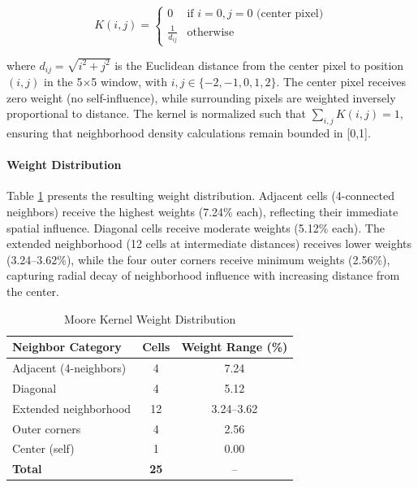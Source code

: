 \documentclass[conference]{IEEEtran}
\begin{document}
\begin{equation}
K(i,j) = \begin{cases}
0 & \text{if } i=0, j=0 \text{ (center pixel)} \\
\frac{1}{d_{ij}} & \text{otherwise}
\end{cases}
\label{eq:moore_kernel}
\end{equation}

where $d_{ij} = \sqrt{i^2 + j^2}$ is the Euclidean distance from the center pixel to position $(i,j)$ in the 5$\times$5 window, with $i,j \in \{-2,-1,0,1,2\}$. The center pixel receives zero weight (no self-influence), while surrounding pixels are weighted inversely proportional to distance. The kernel is normalized such that $\sum_{i,j} K(i,j) = 1$, ensuring that neighborhood density calculations remain bounded in [0,1].

\paragraph{Weight Distribution}
Table \ref{tab:moore_weights} presents the resulting weight distribution. Adjacent cells (4-connected neighbors) receive the highest weights (7.24\% each), reflecting their immediate spatial influence. Diagonal cells receive moderate weights (5.12\% each). The extended neighborhood (12 cells at intermediate distances) receives lower weights (3.24--3.62\%), while the four outer corners receive minimum weights (2.56\%), capturing radial decay of neighborhood influence with increasing distance from the center.

\begin{table}[!t]
\caption{Moore Kernel Weight Distribution}
\label{tab:moore_weights}
\centering
\small
\renewcommand{\arraystretch}{1.2}
\begin{tabular}{lcc}
\toprule
\textbf{Neighbor Category} & \textbf{Cells} & \textbf{Weight Range (\%)} \\
\midrule
Adjacent (4-neighbors) & 4 & 7.24 \\
Diagonal & 4 & 5.12 \\
Extended neighborhood & 12 & 3.24--3.62 \\
Outer corners & 4 & 2.56 \\
Center (self) & 1 & 0.00 \\
\midrule
\textbf{Total} & \textbf{25} & -- \\
\bottomrule
\end{tabular}
\end{table}
\end{document}
